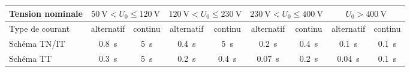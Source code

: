 \begin{exemple}
\begin{table}[h]
\begin{tabularx}{\linewidth}{X cccccccc}
\toprule
Tension nominale		& \multicolumn{2}{c}{$\SI{50}{\volt}<U_0\leq\SI{120}{\volt}$} 	& \multicolumn{2}{c}{$\SI{120}{\volt}<U_0\leq\SI{230}{\volt}$} & \multicolumn{2}{c}{$\SI{230}{\volt}<U_0\leq\SI{400}{\volt}$}		& \multicolumn{2}{c}{$U_0>\SI{400}{\volt}$}\\
\midrule
Type de courant		& alternatif	& continu	& alternatif	& continu	& alternatif	& continu	& alternatif	& continu \\
\addlinespace
Schéma TN/IT	& \SI{0,8}{\second}	&	\SI{5}{\second}	&	\SI{0,4}{\second}	&	\SI{5}{\second}	&	\SI{0,2}{\second}	&	\SI{0,4}{\second}	&	\SI{0,1}{\second}	&	\SI{0,1}{\second} \\	
\addlinespace
Schéma TT	& \SI{0,3}{\second}	&	\SI{5}{\second}	&	\SI{0,2}{\second}	&	\SI{0,4}{\second}	&	\cellcolor{green}\SI{0,07}{\second}	&	\SI{0,2}{\second}	&	\SI{0,04}{\second}	&	\SI{0,1}{\second} \\	
\bottomrule
\end{tabularx}
\end{table}
\end{exemple}

%
